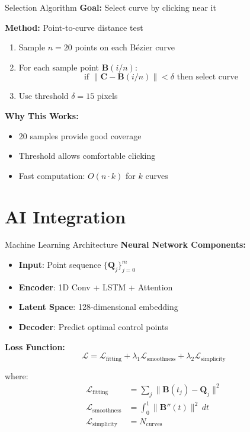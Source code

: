 \documentclass{beamer}
\begin{document}
\begin{frame}{Selection Algorithm}
\textbf{Goal:} Select curve by clicking near it

\textbf{Method:} Point-to-curve distance test
\begin{enumerate}
    \item Sample $n=20$ points on each Bézier curve
    \item For each sample point $\mathbf{B}(i/n)$:
    \begin{equation*}
    \text{if } \|\mathbf{C} - \mathbf{B}(i/n)\| < \delta \text{ then select curve}
    \end{equation*}
    \item Use threshold $\delta = 15$ pixels
\end{enumerate}

\vspace{1em}

\textbf{Why This Works:}
\begin{itemize}
    \item 20 samples provide good coverage
    \item Threshold allows comfortable clicking
    \item Fast computation: $O(n \cdot k)$ for $k$ curves
\end{itemize}
\end{frame}

\section{AI Integration}

\begin{frame}{Machine Learning Architecture}
\textbf{Neural Network Components:}

\begin{itemize}
    \item \textbf{Input}: Point sequence $\{\mathbf{Q}_j\}_{j=0}^{m}$
    \item \textbf{Encoder}: 1D Conv + LSTM + Attention
    \item \textbf{Latent Space}: 128-dimensional embedding
    \item \textbf{Decoder}: Predict optimal control points
\end{itemize}

\vspace{1em}

\textbf{Loss Function:}
\begin{equation*}
\mathcal{L} = \mathcal{L}_{\text{fitting}} + \lambda_1 \mathcal{L}_{\text{smoothness}} + \lambda_2 \mathcal{L}_{\text{simplicity}}
\end{equation*}

where:
\begin{align*}
\mathcal{L}_{\text{fitting}} &= \sum_{j}\|\mathbf{B}(t_j) - \mathbf{Q}_j\|^2 \\
\mathcal{L}_{\text{smoothness}} &= \int_0^1 \|\mathbf{B}''(t)\|^2 \, dt \\
\mathcal{L}_{\text{simplicity}} &= N_{\text{curves}}
\end{align*}
\end{frame}
\end{document}
